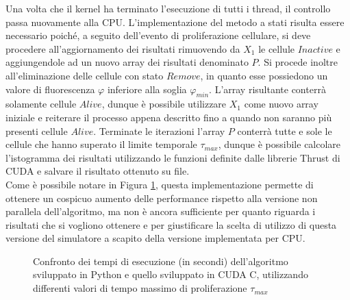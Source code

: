 Una volta che il kernel ha terminato l'esecuzione di tutti i thread, il
controllo passa nuovamente alla CPU.
L'implementazione del metodo a stati risulta essere necessario poiché, 
a seguito dell'evento di proliferazione cellulare,
si deve procedere all'aggiornamento dei risultati rimuovendo
da $X_{1}$ le cellule $Inactive$ e aggiungendole ad un nuovo array dei
risultati denominato $P$.
Si procede inoltre all'eliminazione delle cellule con stato $Remove$, in quanto
esse possiedono un valore di fluorescenza $\varphi$ inferiore alla soglia 
$\varphi_{min}$. L'array risultante conterrà solamente cellule 
$Alive$, dunque è possibile utilizzare $X_{1}$ come nuovo array iniziale e 
reiterare il processo appena descritto fino a quando non saranno più presenti 
cellule $Alive$.
Terminate le iterazioni l'array $P$ conterrà tutte e sole le cellule che hanno
superato il limite temporale $\tau_{max}$, dunque è possibile calcolare
l'istogramma dei risultati utilizzando le funzioni definite dalle librerie
Thrust \cite{bell2011thrust} di CUDA e salvare il risultato ottenuto
su file.
\\
Come è possibile notare in Figura \ref{chart:python-cuda}, questa 
implementazione permette di ottenere un
cospicuo aumento delle performance
rispetto alla versione non parallela dell'algoritmo, ma non è ancora 
sufficiente per quanto riguarda i risultati che si vogliono ottenere e per 
giustificare la scelta di utilizzo di questa versione del simulatore a scapito 
della versione implementata per CPU.
\begin{figure}[t]
    \centering
    \caption{Confronto dei tempi di esecuzione (in secondi) dell'algoritmo 
        sviluppato in Python e quello sviluppato
        in CUDA C, utilizzando differenti valori di tempo massimo di
        proliferazione $\tau_{max}$}
    \label{chart:python-cuda}
\end{figure}

